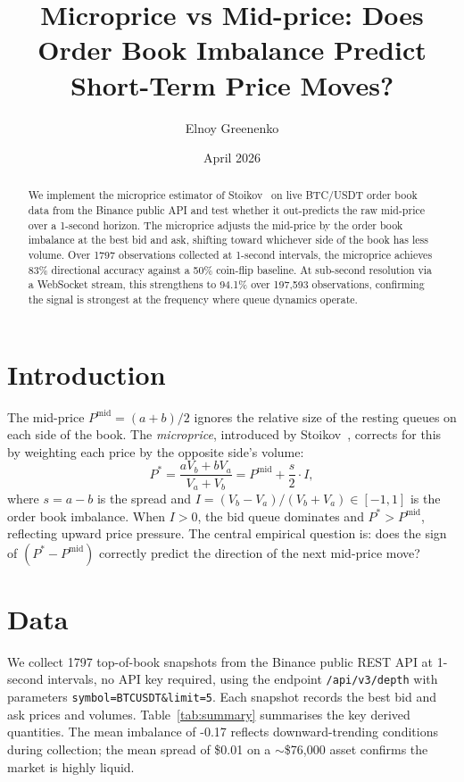 \documentclass[11pt, a4paper]{article}
\title{\textbf{Microprice vs Mid-price:
Does Order Book Imbalance Predict Short-Term Price Moves?}}
\author{Elnoy Greenenko}
\date{April 2026}
\begin{document}
\maketitle

\begin{abstract}
We implement the microprice estimator of Stoikov~\cite{stoikov2018} on live BTC/USDT order book data from the Binance public API and test whether it out-predicts the raw mid-price over a 1-second horizon. The microprice adjusts the mid-price by the order book imbalance at the best bid and ask, shifting toward whichever side of the book has less volume. Over 1797 observations collected at 1-second intervals, the microprice achieves 83\% directional accuracy against a 50\% coin-flip baseline. At sub-second resolution via a WebSocket stream, this strengthens to 94.1\% over 197,593 observations, confirming the signal is strongest at the frequency where queue dynamics operate.
\end{abstract}

\section{Introduction}

The mid-price $P^{\text{mid}} = (a + b)/2$ ignores the relative size of the resting queues on each side of the book. The \emph{microprice}, introduced by Stoikov~\cite{stoikov2018}, corrects for this by weighting each price by the opposite side's volume:
\[
P^* = \frac{a V_b + b V_a}{V_a + V_b} = P^{\text{mid}} + \frac{s}{2} \cdot I,
\]
where $s = a - b$ is the spread and $I = (V_b - V_a)/(V_b + V_a) \in [-1, 1]$ is the order book imbalance. When $I > 0$, the bid queue dominates and $P^* > P^{\text{mid}}$, reflecting upward price pressure. The central empirical question is: does the sign of $(P^* - P^{\text{mid}})$
correctly predict the direction of the next mid-price move?

\section{Data}

We collect 1797 top-of-book snapshots from the Binance public REST API at 1-second intervals, no API key required, using the endpoint \texttt{/api/v3/depth} with parameters \texttt{symbol=BTCUSDT\&limit=5}. Each snapshot records the best bid and ask prices and volumes. Table~\ref{tab:summary} summarises the key derived quantities. The mean imbalance of -0.17 reflects downward-trending conditions during collection; the mean spread of \$0.01 on a $\sim$\$76,000 asset confirms the market is highly liquid.
\end{document}
